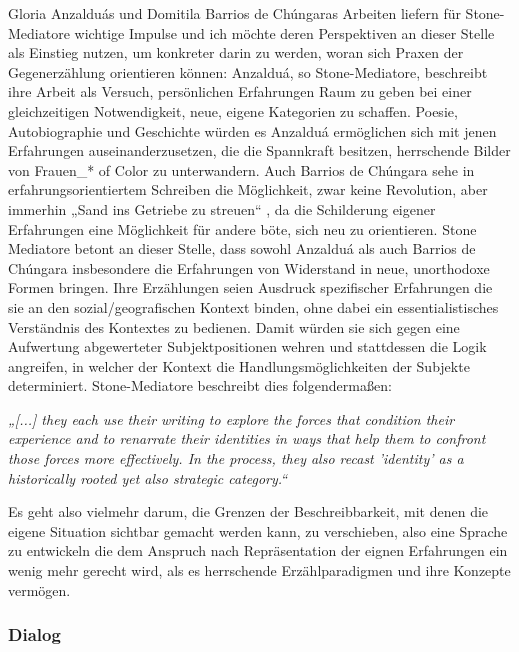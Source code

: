 Gloria Anzalduás und Domitila Barrios de Chúngaras Arbeiten liefern für
Stone-Mediatore wichtige Impulse und ich möchte deren Perspektiven an dieser
Stelle als Einstieg nutzen, um konkreter darin zu werden, woran sich Praxen der
Gegenerzählung orientieren können: Anzalduá, so Stone-Mediatore, beschreibt
ihre Arbeit als Versuch, persönlichen Erfahrungen Raum zu geben bei einer
gleichzeitigen Notwendigkeit, neue, eigene Kategorien zu schaffen. Poesie,
Autobiographie und Geschichte würden es Anzalduá ermöglichen sich mit jenen
Erfahrungen auseinanderzusetzen, die die Spannkraft besitzen, herrschende
Bilder von Frauen\_* of Color zu unterwandern.\footnotemark {} Auch Barrios de Chúngara sehe in
erfahrungsorientiertem Schreiben die Möglichkeit, zwar keine Revolution, aber
immerhin „Sand ins Getriebe zu streuen“ \footnotemark {}, da die Schilderung eigener
Erfahrungen eine Möglichkeit für andere böte, sich neu zu orientieren. Stone
Mediatore betont an dieser Stelle, dass sowohl Anzalduá als auch Barrios de
Chúngara insbesondere die Erfahrungen von Widerstand in neue, unorthodoxe
Formen bringen. Ihre Erzählungen seien Ausdruck spezifischer Erfahrungen die
sie an den sozial/geografischen Kontext binden, ohne dabei ein
essentialistisches Verständnis des Kontextes zu bedienen. Damit würden sie sich
gegen eine Aufwertung abgewerteter Subjektpositionen wehren und stattdessen die
Logik angreifen, in welcher der Kontext die Handlungsmöglichkeiten der Subjekte
determiniert.\footnotemark {} Stone-Mediatore beschreibt dies folgendermaßen:
\begin{myenv}
    \textit{„[...] they each use their writing to explore the forces that
    condition their experience and to renarrate their identities in ways that
  help them to confront those forces more effectively. In the process, they
also recast 'identity' as a historically rooted yet also strategic
category.“\footnotemark {}}
\end{myenv}

Es geht also vielmehr darum, die Grenzen der Beschreibbarkeit, mit denen die
eigene Situation sichtbar gemacht werden kann, zu verschieben, also eine
Sprache zu entwickeln die dem Anspruch nach Repräsentation der eignen
Erfahrungen ein wenig mehr gerecht wird, als es herrschende Erzählparadigmen
und ihre Konzepte vermögen.
\subsubsection{Dialog}

